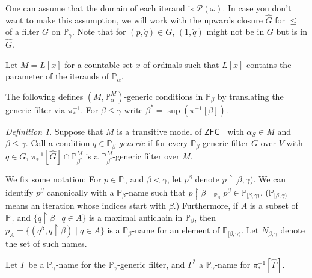 \documentclass[a4paper, 11pt]{amsart}
\theoremstyle{remark}
\newtheorem{definition}[definition]{Definition}
\newcommand{\axiomft}[1]{\mathsf{#1}}
\newcommand{\ZFC}{\axiomft{ZFC}}
\newcommand{\PP}{\mathbb{P}}
\newcommand{\pow}{\mathcal{P}}
\begin{document}

One can assume that the domain of each iterand is $\pow(\omega)$. 
In case you don't want to make this assumption, we will work with the upwards closure $\hat{G}$ for $\leq$ of a filter $G$ on $\PP_\gamma$. 
Note that for $(p,\dot{q})\in G$, $(1,\dot{q})$ might not be in $G$ but is in $\hat{G}$. 

Let $M=L[x]$ for a countable set $x$ of ordinals such that $L[x]$ contains the parameter of the iterands of $\PP_\alpha$. 

The following defines $(M,\PP_{\alpha}^M)$-generic conditions in $\PP_\beta$ by translating the generic filter via $\pi_*^{-1}$. 
For $\beta\leq\gamma$ write 
$\beta^*=\sup(\pi^{-1}[\beta])$. 

\begin{definition} 
Suppose that $M$ is a transitive model of $\ZFC^-$ with $\alpha_S\in M$ and $\beta\leq \gamma$. 
Call a condition $q\in \PP_\beta$ \emph{generic} if for every $\PP_\beta$-generic filter $G$ over $V$ with $q\in G$, $\pi_*^{-1}[\hat{G}]\cap \PP_{\beta^*}^M$ is a $\PP_{\beta^*}^M$-generic filter over $M$. 
\end{definition} 


We fix some notation: 
For $p\in \PP_\gamma$ and $\beta<\gamma$, let $p^\beta$ denote $p{\upharpoonright}[\beta,\gamma)$. 
We can identify $p^\beta$ canonically with a $\PP_\beta$-name such that $p{\upharpoonright}\beta\Vdash_{\PP_\beta} p^\beta\in \PP_{[\beta,\gamma)}$. ($\PP_{[\beta,\gamma)}$ means an iteration whose indices start with $\beta$.) 
Furthermore, if $A$ is a subset of $\PP_\gamma$ and $\{q{\upharpoonright}\beta\mid q\in A\}$ is a maximal antichain in $\PP_\beta$, then $p_A=\{(q^\beta,q{\upharpoonright}\beta)\mid q\in A\}$ is a $\PP_\beta$-name for an element of $\PP_{[\beta,\gamma)}$. 
Let $N_{\beta,\gamma}$ denote the set of such names. 

Let $\Gamma$ be a $\PP_\gamma$-name for the $\PP_\gamma$-generic filter, and $\Gamma^*$ a $\PP_\gamma$-name for $\pi_*^{-1}[\hat{\Gamma}]$. 
\end{document}
